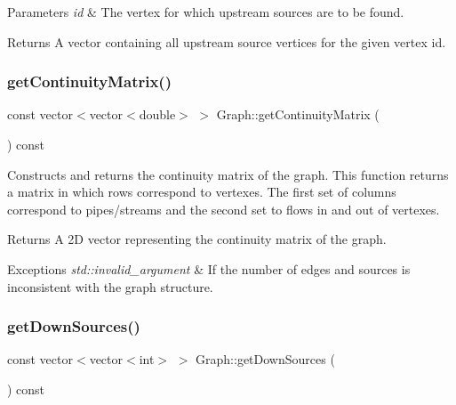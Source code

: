 \begin{DoxyParams}{Parameters}
{\em id} & The vertex for which upstream sources are to be found.\\
\hline
\end{DoxyParams}
\begin{DoxyReturn}{Returns}
A vector containing all upstream source vertices for the given vertex {\ttfamily id}. 
\end{DoxyReturn}
\mbox{\label{classGraph_adeb6eb873f20aef3e2b611a322deb647}} 
\subsubsection{\texorpdfstring{get\+Continuity\+Matrix()}{getContinuityMatrix()}}
{\footnotesize\ttfamily const vector$<$vector$<$double$>$ $>$ Graph\+::get\+Continuity\+Matrix (\begin{DoxyParamCaption}{ }\end{DoxyParamCaption}) const}



Constructs and returns the continuity matrix of the graph. This function returns a matrix in which rows correspond to vertexes. The first set of columns correspond to pipes/streams and the second set to flows in and out of vertexes. 

\begin{DoxyReturn}{Returns}
A 2D vector representing the continuity matrix of the graph.
\end{DoxyReturn}

\begin{DoxyExceptions}{Exceptions}
{\em std\+::invalid\+\_\+argument} & If the number of edges and sources is inconsistent with the graph structure. \\
\hline
\end{DoxyExceptions}
\mbox{\label{classGraph_aa41b35e6be8f6c4d555c7e9c1822809e}} 
\subsubsection{\texorpdfstring{get\+Down\+Sources()}{getDownSources()}}
{\footnotesize\ttfamily const vector$<$vector$<$int$>$ $>$ Graph\+::get\+Down\+Sources (\begin{DoxyParamCaption}{ }\end{DoxyParamCaption}) const}



